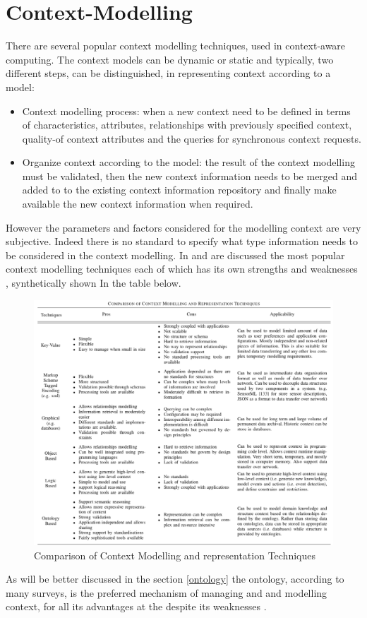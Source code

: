 \documentclass{thesisreport}
\begin{document}
\section{Context-Modelling}
 There are several popular context modelling techniques, used in context-aware computing. The context models can be dynamic or static and typically, two different steps, can be distinguished, in representing context according to a model: 
 \begin{itemize}
     \item Context modelling process: when a new context need to be defined in terms of characteristics, attributes, relationships with previously specified context, quality-of context attributes and the queries for synchronous context requests.
     \item Organize context according to the model: the result of the context modelling must be validated, then the new context information needs to be merged and added to to the existing context information repository and finally make available the new context information when required.
 \end{itemize}
 However the parameters and factors considered for the modelling context are very subjective. Indeed there is no standard to specify what type information needs to be considered in the context modelling.
 In \cite{chen2000survey} and \cite{strang2004context} are discussed the most popular context modelling techniques each of which has its own strengths and weaknesses \cite{perera2014context}, synthetically shown In the table below.
 
 	\begin{figure}[H]
		\centering
		\includegraphics[width=17.5cm]{Thesis/data/ContextModelComparison.png}
		\caption{Comparison of Context Modelling and representation Techniques \cite{perera2014context}}
		\label{fig:populationProspect}
	\end{figure}
 As will be better discussed in the section \ref{ontology} the ontology, according to many surveys, is the preferred mechanism of managing and and modelling context, for all its advantages at the despite its weaknesses \cite{perera2014context}.
 
\end{document}
